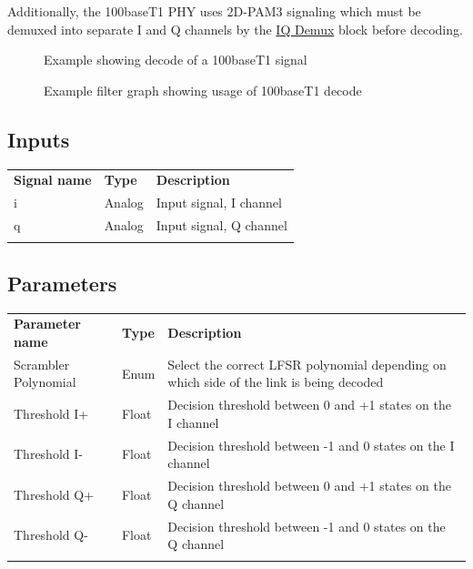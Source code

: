 Additionally, the 100baseT1 PHY uses 2D-PAM3 signaling which must be demuxed into separate I and Q channels by the
\hyperref[filter:iqdemux]{IQ Demux} block before decoding.

\begin{figure}[h]
\centering
{}
\caption{Example showing decode of a 100baseT1 signal}
\label{filter_100baset1}
\end{figure}

\begin{figure}[h]
\centering
{}
\caption{Example filter graph showing usage of 100baseT1 decode}
\label{filter_graph_100baset1}
\end{figure}

\FloatBarrier
\subsection{Inputs}

\begin{tabularx}{16cm}{llX}
\thickhline
\textbf{Signal name} & \textbf{Type} & \textbf{Description} \\
\thickhline
i & Analog & Input signal, I channel\\
\thinhline
q & Analog & Input signal, Q channel\\
\thickhline
\end{tabularx}

\subsection{Parameters}

\begin{tabularx}{16cm}{llX}
\thickhline
\textbf{Parameter name} & \textbf{Type} & \textbf{Description} \\
\thickhline
Scrambler Polynomial & Enum & Select the correct LFSR polynomial depending on which side of the link is being decoded\\
\thinhline
Threshold I+ & Float & Decision threshold between 0 and +1 states on the I channel\\
\thinhline
Threshold I- & Float & Decision threshold between -1 and 0 states on the I channel\\
\thinhline
Threshold Q+ & Float & Decision threshold between 0 and +1 states on the Q channel\\
\thinhline
Threshold Q- & Float & Decision threshold between -1 and 0 states on the Q channel\\
\thickhline
\end{tabularx}

